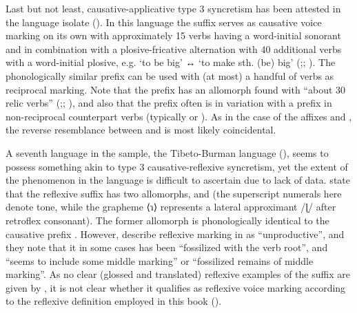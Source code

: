 \newpage

Last but not least, causative-applicative type 3 syncretism has been attested in the language isolate  (). In this language the suffix  serves as causative voice marking on its own with approximately 15 verbs having a word-initial sonorant and in combination with a plosive-fricative alternation with 40 additional verbs with a word-initial plosive, e.g.  ‘to be big’ ↔  ‘to make sth. (be) big’ (\citealt[1721f.]{otaina:nedjalkov:2007};; \citealt[132f.]{nedjalkov:otaina:2013}). The phonologically similar prefix  can be used with (at most) a handful of verbs as reciprocal marking. Note that the prefix  has an allomorph  found with “about 30 relic verbs” (\citealt[1726ff.]{otaina:nedjalkov:2007};; \citealt[107f.]{nedjalkov:otaina:2013}), and also that the prefix often is in variation with a prefix in non-reciprocal counterpart verbs (typically  or ). As in the case of the  affixes  and , the reverse resemblance between   and  is most likely coincidental. 

A seventh language in the sample, the Tibeto-Burman language  (), seems to possess something akin to type 3 causative-reflexive syncretism, yet the extent of the phenomenon in the language is difficult to ascertain due to lack of data. \citet[24, 82]{sun:liu:2009} state that the reflexive suffix  has two allomorphs,  and  (the superscript numerals here denote tone, while the grapheme ⟨ɿ⟩ represents a lateral approximant /ɭ/ after retroflex consonant). The former allomorph  is phonologically identical to the causative prefix . However, \citet[82]{sun:liu:2009} describe reflexive marking in  as “unproductive”, and they note that it in some cases has been “fossilized with the verb root”, and “seems to include some middle marking” or “fossilized remains of middle marking”. As no clear (glossed and translated) reflexive examples of the suffix  are given by \citeauthor{sun:liu:2009}, it is not clear whether it qualifies as reflexive voice marking according to the reflexive definition employed in this book (). 

